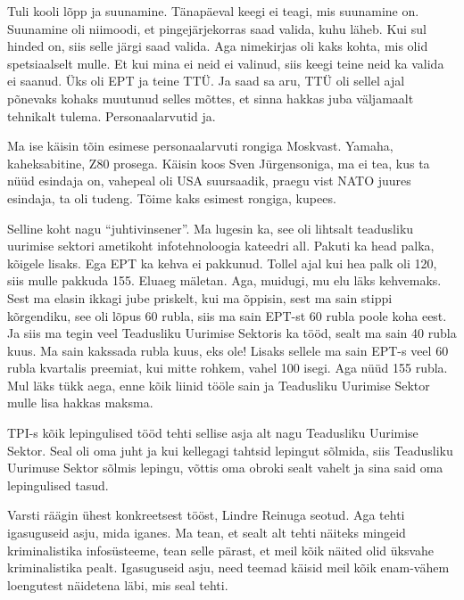 
Tuli kooli lõpp ja suunamine. Tänapäeval keegi ei teagi, mis suunamine on. 
Suunamine oli niimoodi, et pingejärjekorras saad valida, kuhu läheb. Kui sul 
hinded on, siis selle järgi saad valida. Aga  nimekirjas oli kaks kohta, mis 
olid spetsiaalselt mulle. Et kui mina ei neid ei valinud, siis keegi teine neid 
ka valida ei saanud. Üks oli EPT ja teine TTÜ. Ja saad sa aru, TTÜ oli sellel 
ajal põnevaks kohaks muutunud selles mõttes, et sinna hakkas juba väljamaalt 
tehnikalt tulema. Personaalarvutid ja. 

Ma ise käisin tõin esimese personaalarvuti rongiga Moskvast. Yamaha, 
kaheksabitine, Z80 prosega. Käisin koos  Sven 
Jürgensoniga, ma ei tea, kus ta nüüd esindaja on, 
vahepeal oli USA suursaadik, praegu vist NATO juures esindaja, ta oli tudeng. 
Tõime kaks esimest rongiga,  kupees. 


Selline koht nagu \enquote{juhtivinsener}. Ma lugesin ka, see oli lihtsalt 
teadusliku uurimise sektori ametikoht infotehnoloogia kateedri 
all. Pakuti ka head 
palka, kõigele lisaks. Ega EPT ka kehva ei pakkunud. Tollel ajal kui hea palk 
oli 120, siis mulle pakkuda 155. Eluaeg mäletan. Aga,  muidugi, mu elu läks 
kehvemaks. Sest ma elasin ikkagi jube priskelt, kui ma õppisin, sest ma sain 
stippi kõrgendiku, see oli lõpus 60 rubla, siis ma sain EPT-st 60 rubla poole 
koha eest. Ja siis ma tegin veel Teadusliku Uurimise Sektoris ka tööd, sealt ma sain 40 rubla 
kuus. Ma sain kakssada rubla kuus, eks ole! Lisaks sellele ma sain EPT-s veel 
60 rubla kvartalis preemiat, kui mitte rohkem, vahel 100 isegi. Aga nüüd 155 
rubla. Mul läks tükk aega, enne kõik liinid tööle sain ja Teadusliku Uurimise 
Sektor mulle lisa hakkas maksma. 


TPI-s kõik lepingulised tööd tehti sellise asja alt nagu Teadusliku Uurimise 
Sektor. Seal oli oma juht ja kui kellegagi tahtsid lepingut sõlmida, siis 
Teadusliku Uurimuse Sektor sõlmis lepingu, võttis oma obroki sealt vahelt ja 
sina said oma lepingulised tasud. 


Varsti räägin ühest konkreetsest tööst, Lindre Reinuga 
seotud. Aga tehti igasuguseid asju, mida iganes. Ma tean, et sealt alt tehti 
näiteks mingeid kriminalistika infosüsteeme, tean selle pärast, et meil kõik 
näited olid üksvahe kriminalistika pealt. Igasuguseid asju, need teemad käisid 
meil kõik enam-vähem loengutest näidetena läbi, mis seal tehti. 


